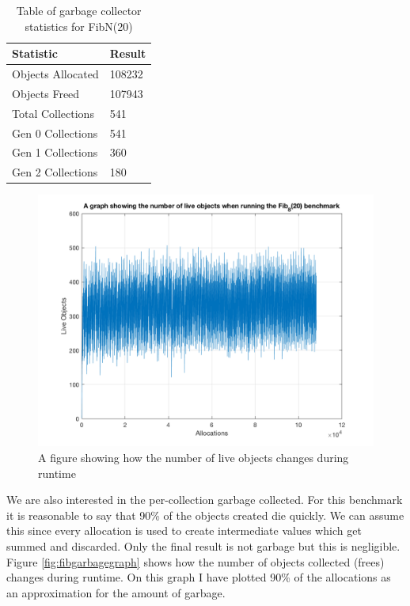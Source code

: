 \documentclass[../diss.tex]{subfiles}
\begin{document}
\begin{table}
    \centering
    \begin{tabular}{| l | l |}
        \hline
         \bf{Statistic} & \bf{Result} \\ \hline
         Objects Allocated & 108232 \\ \hline
         Objects Freed & 107943 \\ \hline
         Total Collections & 541 \\ \hline
         Gen 0 Collections & 541 \\ \hline
         Gen 1 Collections & 360 \\ \hline
         Gen 2 Collections & 180 \\ \hline
    \end{tabular}
    \caption{Table of garbage collector statistics for FibN(20)}
    \label{tab:fibnstats}
\end{table}

\begin{figure}
    \centering
    \includegraphics[max width=\linewidth]{figs/fib8.png}
    \caption{A figure showing how the number of live objects changes during runtime}
    \label{fig:fibngraph}
\end{figure}

We are also interested in the per-collection garbage collected. For this benchmark it is reasonable to say that 90\% of the objects created die quickly. We can assume this since every allocation is used to create intermediate values which get summed and discarded. Only the final result is not garbage but this is negligible. Figure \ref{fig:fibgarbagegraph} shows how the number of objects collected (frees) changes during runtime. On this graph I have plotted 90\% of the allocations as an approximation for the amount of garbage.
\end{document}
